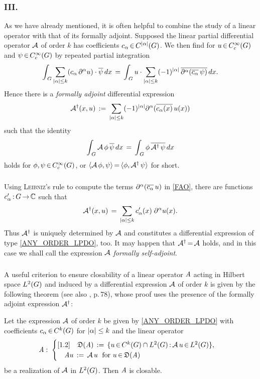 \documentclass[11pt,twoside]{article}
\begin{document}
\subsubsection{III. \TITLEC}
As we have already mentioned,
it is often helpful to combine the study of a linear operator
with that of its formally adjoint.
Supposed the linear partial differential operator ${\mathcal{A}}$ of order $k$
has coefficients $c_{\alpha} \xeof C^{\abs{\alpha} }(\G)$.
We then find for $u {\,\in\,} C_c^{\infty}(G)$ and $\psi {\,\in\,} C_c^{\infty}(G)$
by repeated partial integration
\[
\int_{\,\G} \sum_{\abs{\alpha} \leq k}
(c_{\alpha} \, \PA u) \cdot \overline{\psi} \, dx
\=
\int_{\,\G} u \cdot \sum_{\abs{\alpha} \leq k}
(-1)^{\abs{\alpha} } \, \overline{\PA(\overline{c_{\alpha}} \, \psi)} \, dx.
\]
Hence there is a \textit{formally adjoint} differential expression
\begin{equation}\label{FAO}
\A^{\dag}(x,u) \eqdef
\sum_{\abs{\alpha} \leq k} (-1)^{\abs{\alpha} }
\PA(\overline{c_{\alpha}(x)} \, u(x))
\end{equation}
such that the identity
\[
\int_{\,G} {\mathcal{A}} \, \phi \, \overline{\psi} \, dx 
\,=\,
\int_{\,G} \phi \, \overline{{\mathcal{A}}^{\dag} \, \psi} \, dx 
\]
holds for $\phi,\psi {\,\in\,} C_c^{\infty}(G)$,
or
$\langle {\mathcal{A}}\,\phi,\psi \rangle {\,=\,} \langle \phi,{\mathcal{A}}^{\dag}\,\psi \rangle$
for short.

\subparagraph{} %
Using \textsc{Leibniz}'s rule to compute the terms
$\partial^{\alpha}(\overline{c_{\alpha}} \, u)$ in \eqref{FAO},
there are functions $c_{\alpha}'{\,:\,} G {\,\to\,} {\mathbb{C}}$
such that
\[
\A^{\dag}(x,u) \=
\sum_{\abs{\alpha} \leq k} c_{\alpha}'(x) \; \PA u(x).
\]
Thus ${\mathcal{A}}^{\dag}$ is uniquely determined by ${\mathcal{A}}$
and constitutes a differential expression of type \eqref{ANY_ORDER_LPDO},
too.
It may happen that ${\mathcal{A}}^{\dag} {\,=\,} {\mathcal{A}}$ holds,
and in this case
we shall call the expression ${\mathcal{A}}$ \textit{formally self-adjoint}.

\subparagraph{} %
A useful criterion to ensure closability of a linear operator $\mathit{A}$
acting in Hilbert space $L^2(G)$
and induced by a differential expression ${\mathcal{A}}$ of order $k$
is given by the following theorem
(see also \cite{Yo}, p.\,78),
whose proof uses the presence of the formally adjoint expression ${\mathcal{A}}^{\dag}$:

\begin{theorem}\label{L2_CLOSABILITY_THEOREM}
Let the expression ${\mathcal{A}}$ of order $k$ be given by \eqref{ANY_ORDER_LPDO}
with coefficients $c_{\alpha} {\,\in\,} C^k(G)$ for $\abs{\alpha} \leq k$ and
the linear operator
\[
\mathit{A}: \;
\begin{cases}[1.2]
\quad \mathfrak{D}(\mathit{A}) \,:=\, \{u {\,\in\,} C^k(G) \cap L^2(G) {\,:\,}{\mathcal{A}} \, u {\,\in\,} L^2(G) \},\\
\quad \mathit{A} u \,:=\, {\mathcal{A}}\,u \; \mbox{ for } u {\,\in\,} \mathfrak{D}(\mathit{A})\\
\end{cases}
\]
be a realization of ${\mathcal{A}}$ in $L^2(G)$.
Then $\mathit{A}$ is closable.
\end{theorem}
\end{document}
